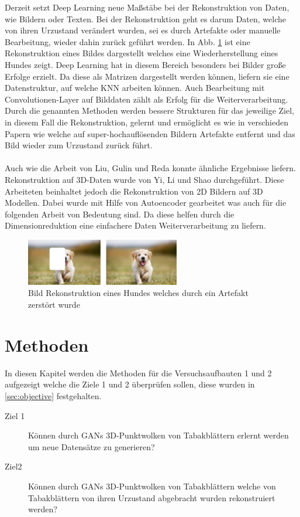 \documentclass{llncs}
\begin{document}
Derzeit setzt Deep Learning neue Maßstäbe bei der Rekonstruktion von Daten, wie Bildern oder Texten. Bei der Rekonstruktion geht es darum Daten, welche von ihren Urzustand verändert wurden, sei es durch Artefakte oder manuelle Bearbeitung, wieder dahin zurück geführt werden. In Abb. \ref{fig:Bild40} ist eine Rekonstruktion eines Bildes dargestellt welches eine Wiederherstellung eines Hundes zeigt. Deep Learning hat in diesem Bereich besonders bei Bilder große Erfolge erzielt. Da diese als Matrizen dargestellt werden können, liefern sie eine Datenstruktur, auf welche KNN arbeiten können. Auch Bearbeitung mit Convolutionen-Layer auf Bilddaten zählt als Erfolg für die Weiterverarbeitung\cite{imagerecon}. Durch die genannten Methoden werden bessere Strukturen für das jeweilige Ziel, in diesem Fall die Rekonstruktion, gelernt und ermöglicht es wie in verschieden Papern wie \cite{imagere1}  welche auf super-hochauflösenden Bildern Artefakte entfernt und das Bild wieder zum Urzustand zurück führt.
\\\\
Auch wie die Arbeit von Liu, Gulin und Reda \cite{imagere2} konnte ähnliche Ergebnisse liefern. Rekonstruktion auf 3D-Daten wurde von Yi, Li und Shao \cite{3d_recon} durchgeführt. Diese Arbeiteten beinhaltet jedoch die Rekonstruktion von 2D Bildern auf 3D Modellen. Dabei wurde mit Hilfe von Autoencoder gearbeitet was auch für die folgenden Arbeit von Bedeutung sind\cite{3d_recon}. Da diese helfen durch die Dimensionreduktion eine einfachere Daten Weiterverarbeitung zu liefern. 

\begin{figure}[htbp] 
	\centering
	\includegraphics[width=0.6\textwidth]{imagere.png}
	\caption{Bild Rekonstruktion eines Hundes welches durch ein Artefakt zerstört wurde}
	\label{fig:Bild40}
\end{figure}
\newpage
\section{Methoden}
In diesen Kapitel werden die Methoden für die Versuchsaufbauten 1 und 2 aufgezeigt welche die Ziele 1 und 2 überprüfen sollen, diese wurden in \ref{sec:objective} festgehalten.

\begin{description}
	\item[Ziel 1]
	Können durch GANs 3D-Punktwolken von Tabakblättern erlernt werden um neue Datensätze zu generieren?\\
	
	\item[Ziel2] Können durch GANs 3D-Punktwolken von Tabakblättern welche von Tabakblättern von ihren Urzustand abgebracht wurden rekonstruiert werden? 
\end{description}
\end{document}
